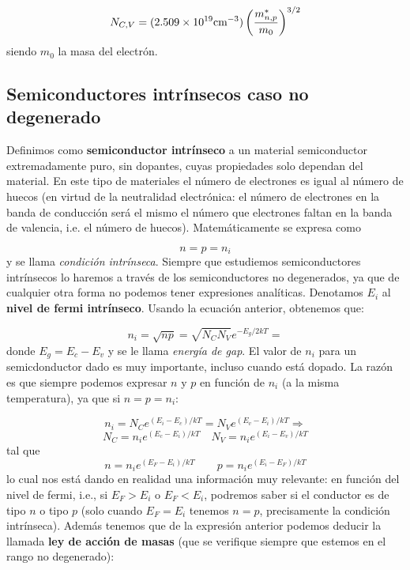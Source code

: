 \begin{equation}
	N_{C,V} = (2.509\times10^{19} \text{cm}^{-3}) \left( \frac{m_{n,p}^*}{m_0} \right)^{3/2}
\end{equation}
siendo $m_0$ la masa del electrón.
\subsection{Semiconductores intrínsecos caso no degenerado}

Definimos como \textbf{semiconductor intrínseco} a un material semiconductor extremadamente puro, sin dopantes, cuyas propiedades solo dependan del material. En este tipo de materiales el número de electrones es igual al número de huecos (en virtud de la neutralidad electrónica: el número de electrones en la banda de conducción será el mismo el número que electrones faltan en la banda de valencia, i.e. el número de huecos). Matemáticamente se expresa como

\begin{equation}
	n = p = n_i
\end{equation}
y se llama \textit{condición intrínseca}. Siempre que estudiemos semiconductores intrínsecos lo haremos a través de los semiconductores no degenerados, ya que de cualquier otra forma no podemos tener expresiones analíticas. Denotamos $E_i$ al \textbf{nivel de fermi intrínseco}. Usando la ecuación anterior, obtenemos que:

\begin{equation}
	n_i = \sqrt{np} = \sqrt{N_CN_V} e^{-E_g/2kT} =
\end{equation}
donde $E_g=E_c-E_v$ y se le llama \textit{energía de gap}. El valor de $n_i$ para un semicdonductor dado es muy importante, incluso cuando está dopado. La razón es que siempre podemos expresar $n$ y $p$  en función de $n_i$ (a la misma temperatura), ya que si $n=p=n_i$:

\begin{equation*}
	n_i = N_C e^{(E_i-E_c)/kT} = N_V e^{(E_v-E_i)/kT}  \Rightarrow
\end{equation*}
\begin{equation}
	N_C=n_i e^{(E_c-E_i)/kT} \quad N_V = n_i e^{(E_i-E_v)/kT} \label{Ec:01-3-13}
\end{equation}
tal que
\begin{equation}
	n=n_i e^{(E_F-E_i)/kT} \qquad p = n_i e^{(E_i-E_F)/kT} \label{Ec:01-3-14}
\end{equation}
lo cual nos está dando en realidad una información muy relevante: en función del nivel de fermi, i.e., si $E_F>E_i$ o $E_F<E_i$, podremos saber si el conductor es de tipo $n$ o tipo $p$ (solo cuando $E_F=E_i$ tenemos $n=p$, precisamente la condición intrínseca). Además tenemos que de la expresión anterior podemos deducir la llamada \textbf{ley de acción de masas} (que se verifique siempre que estemos en el rango no degenerado):

